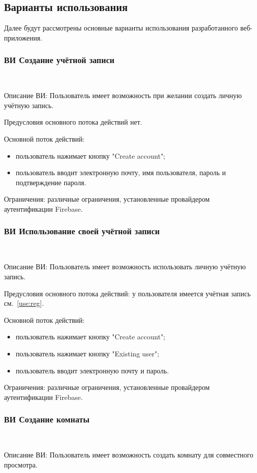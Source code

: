 \subsection{Варианты использования}
Далее будут рассмотрены основные варианты использования разработанного веб-приложения.

\subsubsection{ВИ Создание учётной записи}~\par
\label{use:reg}
Описание ВИ: Пользователь имеет возможность при желании создать личную учётную запись.
 
Предусловия основного потока действий нет.
 
Основной поток действий:
\begin{itemize}
   \item пользователь нажимает кнопку "Create account";
   \item пользователь вводит электронную почту, имя пользователя, пароль и подтверждение пароля.
\end{itemize}
 
Ограничения: различные ограничения, установленные провайдером аутентификации Firebase.
 
\subsubsection{ВИ Использование своей учётной записи}~\par
Описание ВИ: Пользователь имеет возможность использовать личную учётную запись.
 
Предусловия основного потока действий: у пользователя имеется учётная запись см.~\ref{use:reg}.
 
Основной поток действий:
\begin{itemize}
   \item пользователь нажимает кнопку "Create account";
   \item пользователь нажимает кнопку "Existing user";
   \item пользователь вводит электронную почту и пароль.
\end{itemize}
 
Ограничения: различные ограничения, установленные провайдером аутентификации Firebase.

\subsubsection{ВИ Создание комнаты}~\par
\label{use:roomcreate}
Описание ВИ: Пользователь имеет возможность создать комнату для совместного просмотра.
 
